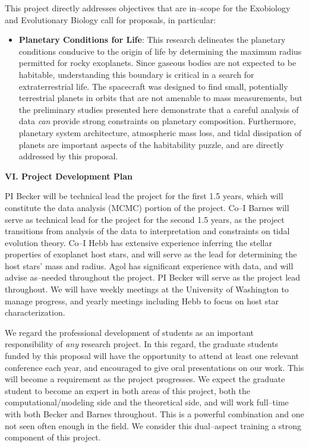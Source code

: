 This project directly addresses objectives that are in--scope for the
Exobiology and Evolutionary Biology call for proposals, in particular:
\begin{itemize}

\item {\bf Planetary Conditions for Life}: 
This research delineates the planetary conditions conducive to the origin
of life by determining the maximum radius permitted for rocky
exoplanets. Since gaseous bodies are not expected to be habitable, understanding this boundary is critical in a search
for extraterrestrial life. The \kepler spacecraft was designed to find
small, potentially terrestrial planets in orbits that are not amenable
to mass measurements, but the preliminary studies presented here
demonstrate that a careful analysis of \kepler data {\it can} provide strong
constraints on planetary composition.  Furthermore, planetary system architecture, atmospheric mass loss, and tidal dissipation of planets are important aspects of the habitability puzzle, and are directly addressed by this proposal.

\end{itemize}

\bigskip
\centerline{\bf VI. Project Development Plan}
\smallskip

PI Becker will be technical lead the project for the first 1.5 years,
which will constitute the data analysis (MCMC) portion of the project.
Co--I Barnes will serve as technical lead for the project for the
second 1.5 years, as the project transitions from analysis of the data
to interpretation and constraints on tidal evolution theory.  
Co--I Hebb has extensive
experience inferring the stellar properties of exoplanet host stars,
and will serve as the lead for determining the host stars' mass and
radius.  Agol has significant experience with \kepler data, and will advise
as--needed throughout the project.  PI Becker will serve as the project lead throughout.  We will
have weekly meetings at the University of Washington to manage
progress, and yearly meetings including Hebb to focus on host star
characterization.

We regard the professional development of students as an important
responsibility of {\it any} research project.  In this regard, the
graduate students funded by this proposal will have the opportunity to
attend at least one relevant conference each year, and encouraged to
give oral presentations on our work.  This will become a requirement
as the project progresses.  We expect the graduate student to become
an expert in both areas of this project, both the
computational/modeling side and the theoretical side, and will work
full--time with both Becker and Barnes throughout.  This is a powerful
combination and one not seen often enough in the field.  We consider
this dual--aspect training a strong component of this project.

